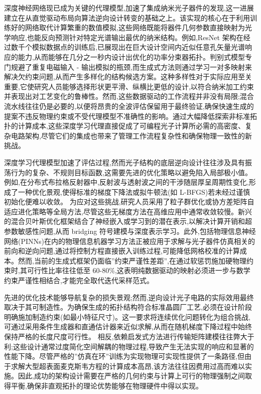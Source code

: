\documentclass[11pt]{article}
\begin{document}
深度神经网络现已成为关键的代理模型,加速了集成纳米光子器件的发现,这一进展建立在从直觉驱动布局向算法逆向设计转变的基础之上。该实现的核心在于利用训练好的网络取代计算繁重的数值模拟,这些网络既能将器件几何参数直接映射为光学响应,也能反向预测针对特定光谱输出最优的纳米结构。例如,ResNet 架构在经过数千个模拟数据点的训练后,已展现出在巨大设计空间内近似任意孔矢量光谱响应的能力,从而能够在几分之一秒内设计出优化的功率分束器拓扑。判别式模型专门规避了重复电磁输入 - 输出模拟的瓶颈,而生成式方法则通过学习一对多映射来解决欠约束问题,从而产生多样化的结构候选方案。这种多样性对于实际应用至关重要,它使研究人员能够选择形状更平滑、纵横比更低的设计,以符合纳米加工约束并表现出对工艺变化的鲁棒性。然而,这些数据驱动的工作流程并非没有局限;混合流水线往往仍是必要的,以便将昂贵的全波评估保留用于最终验证,确保快速生成的提案不违反物理约束或不受代理模型不准确性的影响。通过大幅降低探索非标准拓扑的计算成本,这些深度学习代理直接促成了可编程光子计算所必需的高密度、复杂电路架构,尽管它们的集成也带来了管理工作流程复杂性和确保物理一致性的新挑战。\citep{doi_10_1038_s41598_018_37952_2_076b64f9} \citep{doi_10_29026_oes_2022_210012_27973a69} \citep{doi_10_1109_access_2026_3697666_bd5258a6}

深度学习代理模型加速了评估过程,然而光子结构的底层逆向设计往往涉及具有振荡行为的复杂、不规则目标函数,这需要先进的优化策略以避免陷入局部极小值。例如,在分布式布拉格反射器中,反射波与透射波之间的干涉随层厚呈周期性变化,形成了一种优化景观,使得标准的梯度下降法或拟牛顿法(如 L-BFGS)若未经过谨慎初始化便难以收敛。\citep{doi_10_1515_nanoph_2020_0379_1cc596ab} 为应对这些挑战,研究人员采用了粒子群优化或协方差矩阵自适应进化策略等全局方法,尽管这些无梯度方法在高维应用中通常收敛较慢。新兴的混合贝叶斯优化框架结合了神经嵌入或学习到的潜在表示,以解决计算开销和超参数敏感性问题,从而 bridging 符号建模与深度表示学习。此外,包括物理信息神经网络(PINNs)在内的物理信息机器学习方法正被应用于求解与光子器件仿真相关的前向和逆向问题,通过将控制方程直接嵌入训练过程,可能降低网格校准的计算成本。然而,当前的生成式框架仍面临''约束严谨性差距'',在通过软惩罚施加硬物理约束时,其可行性比率往往低至 60-80\%,这表明纯数据驱动的映射必须进一步与数学约束严谨性相结合,才能完全取代迭代采样范式。\citep{doi_10_48550_arxiv_2602_18148_e9c0a72b} \citep{doi_10_48550_arxiv_2511_00070_bf8eda11} \citep{doi_10_48550_arxiv_2606_12337_68b62bfa}

先进的优化技术能够导航复杂的损失景观;然而,逆向设计光子电路的实际效用最终取决于其可制造性。为确保生成的拓扑结构符合标准晶圆厂工艺,必须在设计阶段明确施加制造约束(如最小特征尺寸)。这一要求将连续优化问题转化为组合挑战,可通过采用条件生成器和直通估计器来近似求解,从而在随机梯度下降过程中始终保持严格的长度尺度可行性。\citep{doi_10_1021_acsphotonics_2c00313_0d7d39c3} 相反,依赖启发式方法进行传输矩阵建模往往弊大于利;这些设计通常过度简化空间解耦的物理过程,导致产生无法实现的响应和显著的性能下降。尽管严格的''仿真在环''训练为实现物理可实现性提供了一条路径,但由于求解大型超表面麦克斯韦方程的计算成本高昂,该方法往往因费用过高而难以实施。因此,成功的架构设计需要在严格的几何约束与计算上可行的物理强制之间取得平衡,确保非直观拓扑的理论优势能够在物理硬件中得以实现。\citep{doi_10_1021_acsphotonics_2c00313_0d7d39c3} \citep{doi_10_48550_arxiv_2505_18377_a6fc9ec3}
\end{document}
